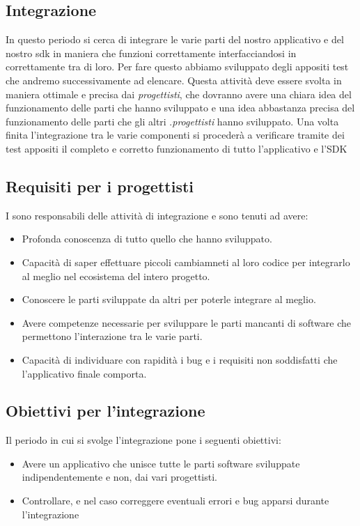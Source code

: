 \subsection{Integrazione}
In questo periodo si cerca di integrare le varie parti del nostro applicativo e del nostro sdk in maniera che funzioni correttamente interfacciandosi in  correttamente tra di loro. Per fare questo abbiamo sviluppato degli appositi test che andremo successivamente ad elencare.
Questa attività deve essere svolta in maniera ottimale e precisa dai \textit{progettisti}, che dovranno avere una chiara idea del funzionamento delle parti che hanno sviluppato e una idea abbastanza precisa del funzionamento delle parti che gli altri .\textit{progettisti} hanno sviluppato. Una volta finita l'integrazione tra le varie componenti si procederà a verificare tramite dei test appositi il completo e corretto funzionamento di tutto l'applicativo e l'SDK

\subsection{Requisiti per i progettisti}
I \textit{\ProgP} sono responsabili delle attività di integrazione e sono tenuti ad avere:
\begin{itemize}
\item
Profonda conoscenza di tutto quello che hanno sviluppato.
\item
Capacità di saper effettuare piccoli cambiamneti al loro codice per integrarlo al meglio nel ecosistema del intero progetto.
\item
Conoscere le parti sviluppate da altri per poterle integrare al meglio.
\item
Avere competenze necessarie per sviluppare le parti mancanti di software che permettono l'interazione tra le varie parti.
\item
Capacità di individuare con rapidità i bug e i requisiti non soddisfatti che l'applicativo finale comporta.
\end{itemize}

\subsection{Obiettivi per l'integrazione}
Il periodo in cui si svolge l'integrazione pone i seguenti obiettivi:
\begin{itemize}
\item Avere un applicativo che unisce tutte le parti software sviluppate indipendentemente e non, dai vari progettisti.
\item Controllare, e nel caso correggere eventuali errori e bug apparsi durante l'integrazione
\end{itemize}


